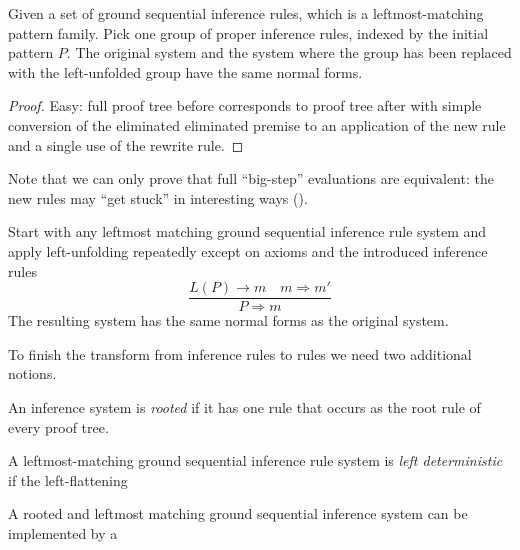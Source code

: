 \documentclass[letterpaper,11pt]{article}
\begin{document}
\begin{proposition}
  Given a set of ground sequential inference rules, which is a leftmost-matching pattern
  family. Pick one group of proper inference rules, indexed by the initial pattern $P$. The original
  system and the system where the group has been replaced with the left-unfolded group have the same
  normal forms.
\end{proposition}
\begin{proof}
  Easy: full proof tree before corresponds to proof tree after with simple conversion of the
  eliminated eliminated premise to an application of the new rule and a single use of the rewrite
  rule.
\end{proof}

Note that we can only prove that full ``big-step'' evaluations are equivalent: the new rules may
``get stuck'' in interesting ways ().

\begin{lemma}
  Start with any leftmost matching ground sequential inference rule system and apply left-unfolding
  repeatedly except on axioms and the introduced inference rules
  \begin{displaymath}
    \dfrac{ L(P) → m \quad m ⇒ m' }{ P ⇒ m }
  \end{displaymath}
  The resulting system has the same normal forms as the original system.
\end{lemma}

To finish the transform from inference rules to \HAX rules we need two additional notions.

\begin{definition}
  An inference system is \emph{rooted} if it has one rule that occurs as the root rule of every
  proof tree.
\end{definition}

\begin{definition}
  A leftmost-matching ground sequential inference rule system is \emph{left deterministic} if the
  left-flattening 
\end{definition}

\begin{theorem}
  A rooted and leftmost matching ground sequential inference system can be implemented by a 
\end{theorem}
\end{document}
